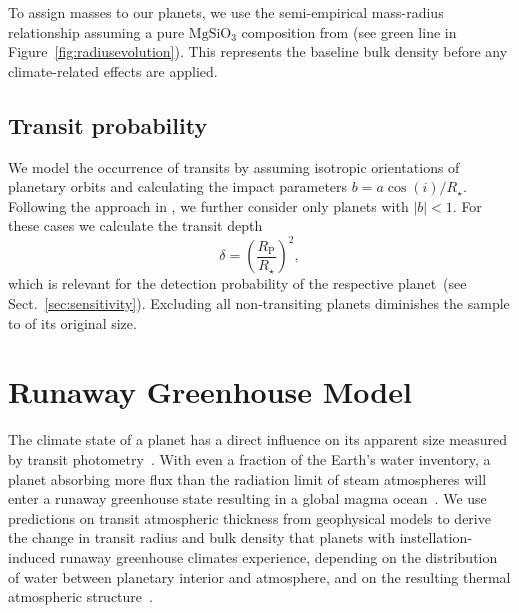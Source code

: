 \documentclass[twocolumn,twocolappendix]{aastex631}
\begin{document}
To assign masses to our planets, we use the semi-empirical mass-radius relationship assuming a pure $\mathrm{MgSiO_3}$ composition from \citet{Zeng2016} (see green line in Figure~\ref{fig:radiusevolution}).
This represents the baseline bulk density before any climate-related effects are applied.


\subsection{Transit probability}
We model the occurrence of transits by assuming isotropic orientations of planetary orbits and calculating the impact parameters $b = a \cos(i)/R_\star$.
Following the approach in \citet{Bixel2021}, we further consider only planets with $|b| < 1$.
For these cases we calculate the transit depth
\begin{equation}\label{eq:transitdepth}
    \delta = \left( \frac{R_\mathrm{P}}{R_\star} \right)^2,
\end{equation}
which is relevant for the detection probability of the respective planet~(see Sect.~\ref{sec:sensitivity}).
Excluding all non-transiting planets diminishes the sample to  of its original size.


\section{Runaway Greenhouse Model}\label{sec:met_rghmodel}
The climate state of a planet has a direct influence on its apparent size measured by transit photometry~\citep{Turbet2019,Turbet2020,Mousis2020,2021ApJ...914...84A}.
With even a fraction of the Earth's water inventory, a planet absorbing more flux than the radiation limit of steam atmospheres will enter a runaway greenhouse state resulting in a global magma ocean~\citep{Lichtenberg2021c,Boukrouche2021}.
We use predictions on transit atmospheric thickness from geophysical models to derive the change in transit radius and bulk density that planets with instellation-induced runaway greenhouse climates experience, depending on the distribution of water between planetary interior and atmosphere, and on the resulting thermal atmospheric structure~\citep{Dorn2021,Salvador2023}.
\end{document}
